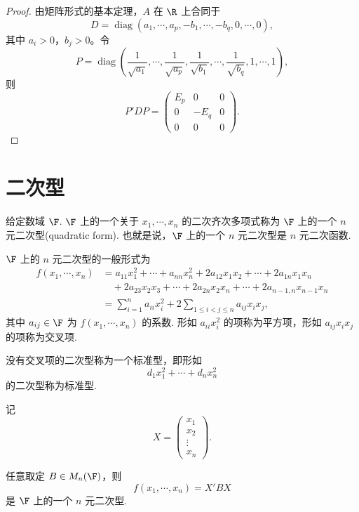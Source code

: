\begin{proof}
	由矩阵形式的基本定理，$A$ 在 $\R$ 上合同于
	\[
	D=\operatorname{diag}(a_1,\cdots,a_p,-b_1,\cdots,-b_q,0,\cdots,0),
	\]
	其中 $a_i>0$，$b_j>0$。令
	\[
	P=\operatorname{diag}\left(
	\frac1{\sqrt{a_1}},\cdots,\frac1{\sqrt{a_p}},
	\frac1{\sqrt{b_1}},\cdots,\frac1{\sqrt{b_q}},
	1,\cdots,1
	\right),
	\]
	则
	\[
	P'DP=
	\begin{pmatrix}
		E_p&0&0\\
		0&-E_q&0\\
		0&0&0
	\end{pmatrix}.
	\]
\end{proof}
\section{二次型}


\begin{definition}\label{p1:concept:c7-l1012}
	给定数域 $\F$. $\F$ 上的一个关于 $x_1,\cdots,x_n$ 的二次齐次多项式称为 $\F$ 上的一个 $n$ 元二次型(quadratic form). 也就是说，$\F$ 上的一个 $n$ 元二次型是 $n$ 元二次函数.
\end{definition}

$\F$ 上的 $n$ 元二次型的一般形式为
\[
\begin{aligned}
	f(x_1,\cdots,x_n)
	&=a_{11}x_1^2+\cdots+a_{nn}x_n^2
	+2a_{12}x_1x_2+\cdots+2a_{1n}x_1x_n \\
	&\quad +2a_{23}x_2x_3+\cdots+2a_{2n}x_2x_n
	+\cdots+2a_{n-1,n}x_{n-1}x_n \\
	&=\sum_{i=1}^n a_{ii}x_i^2+2\sum_{1\le i<j\le n}a_{ij}x_ix_j,
\end{aligned}
\]
\label{p1:concept:c7-l1027}其中 $a_{ij}\in\F$ 为 $f(x_1,\cdots,x_n)$ 的系数. 形如 $a_{ii}x_i^2$ 的项称为平方项，形如 $a_{ij}x_ix_j$ 的项称为交叉项.



\begin{definition}\label{p1:concept:c7-l1031}
	没有交叉项的二次型称为一个标准型，即形如
	\[
	d_1x_1^2+\cdots+d_nx_n^2
	\]
	的二次型称为标准型.
\end{definition}

记
\[
X=\begin{pmatrix}
	x_1\\x_2\\ \vdots\\x_n
\end{pmatrix}.
\]

\begin{example}
	任意取定 $B\in M_n(\F)$，则
	\[
	f(x_1,\cdots,x_n)=X'BX
	\]
	是 $\F$ 上的一个 $n$ 元二次型.
\end{example}



